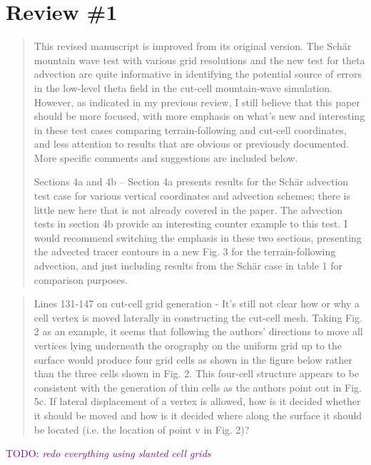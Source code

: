\documentclass{article}
\newcommand{\TODO}[1]{\textcolor{purple}{TODO: \emph{#1}}}
\begin{document}
\section*{Review \#1}
\begin{quotation}
This revised manuscript is improved from its original version. The Sch\"{a}r mountain wave test with various grid resolutions and the new test for theta advection are quite informative in identifying the potential source of errors in the low-level theta field in the cut-cell mountain-wave simulation. However, as indicated in my previous review, I still believe that this paper should be more focused, with more emphasis on what's new and interesting in these test cases comparing terrain-following and cut-cell coordinates, and less attention to results that are obvious or previously documented. More specific comments and suggestions are included below. 

Sections 4a and 4b – Section 4a presents results for the Sch\"{a}r advection test case for various vertical coordinates and advection schemes; there is little new here that is not already covered in the \citet{schaer2002} paper. The advection tests in section 4b provide an interesting counter example to this test. I would recommend switching the emphasis in these two sections, presenting the advected tracer contours in a new Fig. 3 for the terrain-following advection, and just including results from the Sch\"{a}r case in table 1 for comparison purposes.
\end{quotation}
\begin{quotation}
 Lines 131-147 on cut-cell grid generation - It's still not clear how or why a cell vertex  is moved laterally in constructing the cut-cell mesh. Taking Fig. 2 as an example, it  seems that following the authors' directions to move all vertices lying underneath the  orography on the uniform grid up to the surface would produce four grid cells as  shown in the figure below rather than the three cells shown in Fig. 2. This four-cell structure appears to be consistent with the generation of thin cells as the authors  point out in Fig. 5c. If lateral displacement of a vertex is allowed, how is it decided  whether it should be moved and how is it decided where along the surface it should  be located (i.e. the location of point v in Fig. 2)?
\end{quotation}
\TODO{redo everything using slanted cell grids}
\end{document}
